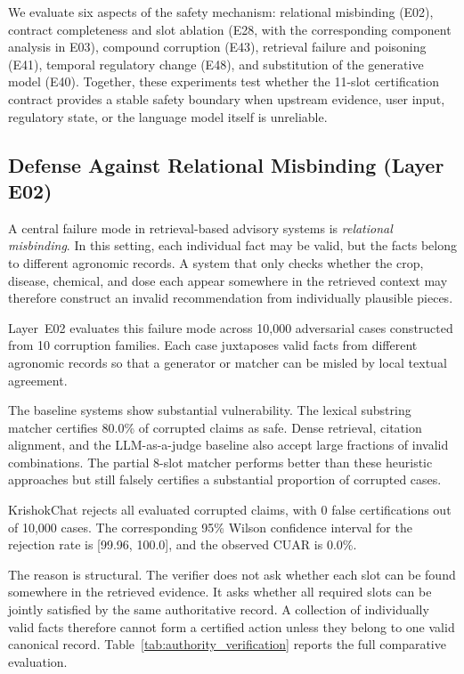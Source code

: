 \documentclass[a4paper,fleqn]{cas-dc}
\begin{document}
We evaluate six aspects of the safety mechanism: relational misbinding (E02), contract completeness and slot ablation (E28, with the corresponding component analysis in E03), compound corruption (E43), retrieval failure and poisoning (E41), temporal regulatory change (E48), and substitution of the generative model (E40). Together, these experiments test whether the 11-slot certification contract provides a stable safety boundary when upstream evidence, user input, regulatory state, or the language model itself is unreliable.

\subsection{Defense Against Relational Misbinding (Layer E02)}

A central failure mode in retrieval-based advisory systems is \textit{relational misbinding}. In this setting, each individual fact may be valid, but the facts belong to different agronomic records. A system that only checks whether the crop, disease, chemical, and dose each appear somewhere in the retrieved context may therefore construct an invalid recommendation from individually plausible pieces.

Layer~E02 evaluates this failure mode across 10{,}000 adversarial cases constructed from 10 corruption families. Each case juxtaposes valid facts from different agronomic records so that a generator or matcher can be misled by local textual agreement.

The baseline systems show substantial vulnerability. The lexical substring matcher certifies 80.0\% of corrupted claims as safe. Dense retrieval, citation alignment, and the LLM-as-a-judge baseline also accept large fractions of invalid combinations. The partial 8-slot matcher performs better than these heuristic approaches but still falsely certifies a substantial proportion of corrupted cases.

KrishokChat rejects all evaluated corrupted claims, with 0 false certifications out of 10{,}000 cases. The corresponding 95\% Wilson confidence interval for the rejection rate is [99.96, 100.0], and the observed CUAR is 0.0\%.

The reason is structural. The verifier does not ask whether each slot can be found somewhere in the retrieved evidence. It asks whether all required slots can be jointly satisfied by the same authoritative record. A collection of individually valid facts therefore cannot form a certified action unless they belong to one valid canonical record. Table~\ref{tab:authority_verification} reports the full comparative evaluation.
\end{document}

